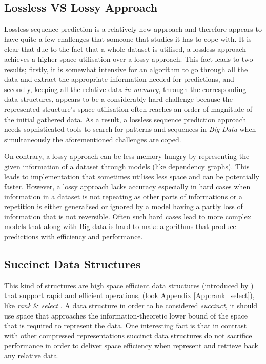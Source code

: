 \subsection{Lossless VS Lossy Approach}{\label{losslessVSlossy}}
Lossless sequence prediction is a relatively new approach and therefore appears to have quite a few challenges that someone that studies it has to cope with. It is clear that due to the fact that a whole dataset is utilised, a lossless approach achieves a higher space utilisation over a lossy approach. This fact leads to two results; firstly, it is somewhat intensive for an algorithm to go through all the data and extract the appropriate information needed for predictions, and secondly, keeping all the relative data \emph{in memory}, through the corresponding data structures, appears to be a considerably hard challenge because the represented structure's space utilisation often reaches an order of magnitude of the initial gathered data. As a result, a lossless sequence prediction approach needs sophisticated tools to search for patterns and sequences in \emph{Big Data} when simultaneously the aforementioned challenges are coped.
\par On contrary, a lossy approach can be less memory hungry by representing the given information of a dataset through models (like dependency graphs). This leads to implementation that sometimes utilises less space and can be potentially faster. However, a lossy approach lacks accuracy especially in hard cases when information in a dataset is not repeating as other parts of informations or a repetition is either generalised or ignored by a model having a partly loss of information that is not reversible. Often such hard cases lead to more complex models that along with Big data is hard to make algorithms that produce predictions with efficiency and performance.

\subsection{Succinct Data Structures}\label{SDS}
This kind of structures are high space efficient data structures (introduced by \citeauthor{Jacobson89} \citeyear{Jacobson89}) that support rapid and efficient operations, (look Appendix \ref{App:rank_select}), like \emph{rank} \& \emph{select} \cite{dillabaugh_2007, Jacobson89}. A data structure in order to be considered \emph{succinct}, it should use space that approaches the information-theoretic lower bound of the space that is required to represent the data. One interesting fact is that in contrast with other compressed representations succinct data structures do not sacrifice performance in order to deliver space efficiency when represent and retrieve back any relative data. 

